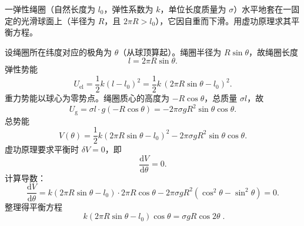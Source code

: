 


\begin{question}
一弹性绳圈（自然长度为 \(l_0\)，弹性系数为 \(k\)，单位长度质量为 \(\sigma\)）水平地套在一固定的光滑球面上（半径为 \(R\)，且 \(2\pi R > l_0\)），它因自重而下滑。用虚功原理求其平衡方程。

\begin{solution}
设绳圈所在纬度对应的极角为 \(\theta\)（从球顶算起）。绳圈半径为 \(R\sin\theta\)，故绳圈长度
\[
l = 2\pi R\sin\theta .
\]
弹性势能
\[
U_{\text{el}} = \frac12 k(l-l_0)^2
= \frac12 k\,(2\pi R\sin\theta - l_0)^2 .
\]
重力势能以球心为零势点。绳圈质心的高度为 \(-R\cos\theta\)，总质量 \(\sigma l\)，故
\[
U_{\text{g}} = \sigma l\cdot g(-R\cos\theta)
= -2\pi\sigma g R^2\sin\theta\cos\theta .
\]
总势能
\[
V(\theta) = \frac12 k(2\pi R\sin\theta - l_0)^2
- 2\pi\sigma g R^2\sin\theta\cos\theta .
\]
虚功原理要求平衡时 \(\delta V = 0\)，即
\[
\frac{\mathrm d V}{\mathrm d\theta} = 0 .
\]
计算导数：
\[
\frac{\mathrm d V}{\mathrm d\theta}
= k(2\pi R\sin\theta - l_0)\cdot 2\pi R\cos\theta
- 2\pi\sigma g R^2(\cos^2\theta - \sin^2\theta) = 0 .
\]
整理得平衡方程
\[
\boxed{\;k(2\pi R\sin\theta - l_0)\cos\theta
= \sigma g R\cos 2\theta\;}.
\]
\end{solution}
\end{question}

